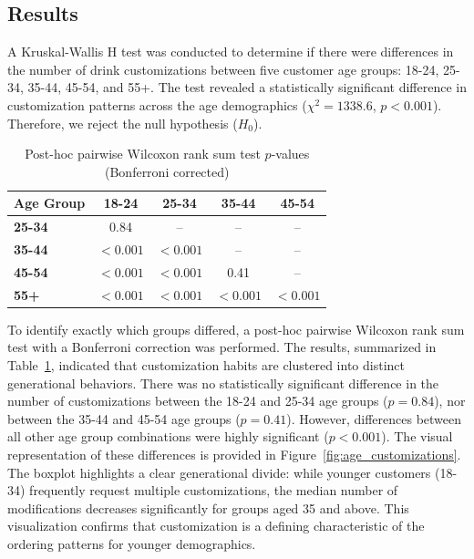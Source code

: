 \documentclass[12pt]{report}
\begin{document}
\subsection{Results}
A Kruskal-Wallis H test was conducted to determine if there were differences in the number of drink customizations between five customer age groups: 18-24, 25-34, 35-44, 45-54, and 55+. The test revealed a statistically significant difference in customization patterns across the age demographics (\(\chi^2 = 1338.6\), \(p < 0.001\)). Therefore, we reject the null hypothesis (\(H_0\)).

\begin{table}[H]
    \centering
    \renewcommand{\arraystretch}{1.2}
    \begin{tabular}{l c c c c}
        \hline
        \textbf{Age Group} & \textbf{18-24} & \textbf{25-34} & \textbf{35-44} & \textbf{45-54} \\
        \hline
        \textbf{25-34}     & 0.84           & --             & --             & --             \\
        \textbf{35-44}     & \(<0.001\)       & \(<0.001\)       & --             & --             \\
        \textbf{45-54}     & \(<0.001\)       & \(<0.001\)       & 0.41           & --             \\
        \textbf{55+}       & \(<0.001\)       & \(<0.001\)       & \(<0.001\)       & \(<0.001\)       \\
        \hline
    \end{tabular}
    \caption{Post-hoc pairwise Wilcoxon rank sum test \(p\)-values (Bonferroni corrected)}\label{tab:posthoc_customizations}
\end{table}

\noindent To identify exactly which groups differed, a post-hoc pairwise Wilcoxon rank sum test with a Bonferroni correction was performed. The results, summarized in Table~\ref{tab:posthoc_customizations}, indicated that customization habits are clustered into distinct generational behaviors. There was no statistically significant difference in the number of customizations between the 18-24 and 25-34 age groups (\(p = 0.84\)), nor between the 35-44 and 45-54 age groups (\(p = 0.41\)). However, differences between all other age group combinations were highly significant (\(p < 0.001\)). The visual representation of these differences is provided in Figure~\ref{fig:age_customizations}. The boxplot highlights a clear generational divide: while younger customers (18-34) frequently request multiple customizations, the median number of modifications decreases significantly for groups aged 35 and above. This visualization confirms that customization is a defining characteristic of the ordering patterns for younger demographics.
\end{document}
